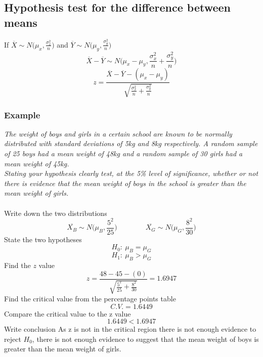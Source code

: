 \documentclass{article}[18pt]
\begin{document}
\subsection{Hypothesis test for the difference between means}
If $\overline{X}\sim N\Big(\mu_x,\frac{\sigma^2_x}{n}\Big)$ and $\overline{Y}\sim N\Big(\mu_y,\frac{\sigma^2_y}{n}\Big)$
$$\overline{X}-\overline{Y}\sim N\Bigg(\mu_x-\mu_y,\frac{\sigma^2_x}{n}+\frac{\sigma^2_y}{n}\Bigg)$$
$$z=\frac{\overline{X}-\overline{Y}-(\mu_x-\mu_y)}{\sqrt{\frac{\sigma^2_x}{n}+\frac{\sigma^2_y}{n}}}$$
\subsubsection{Example}
\textit{The weight of boys and girls in a certain school are known to be normally distributed with standard deviations of 5kg and 8kg respectively. A random sample of 25 boys had a mean weight of 48kg and a random sample of 30 girls had a mean weight of 45kg.\\
Stating your hypothesis clearly test, at the 5\% level of significance, whether or not there is evidence that the mean weight of boys in the school is greater than the mean weight of girls.}\\
\\
Write down the two distributions
$$\overline{X_B}\sim N\Big(\mu_B,\frac{5^2}{25}\Big) \qquad \qquad \overline{X_G}\sim N\Big(\mu_G,\frac{8^2}{30}\Big)$$
State the two hypotheses
$$H_0: \ \mu_B=\mu_G$$
$$H_1: \ \mu_B>\mu_G$$
Find the $z$ value
$$z=\frac{48-45-(0)}{\sqrt{\frac{5^2}{25}+\frac{8^2}{30}}}=1.6947$$
Find the critical value from the percentage points table
$$C.V.=1.6449$$
Compare the critical value to the z value
$$1.6449<1.6947$$
Write conclusion
As z is not in the critical region there is not enough evidence to reject $H_0$, there is not enough evidence to suggest that the mean weight of boys is greater than the mean weight of girls.
\end{document}
